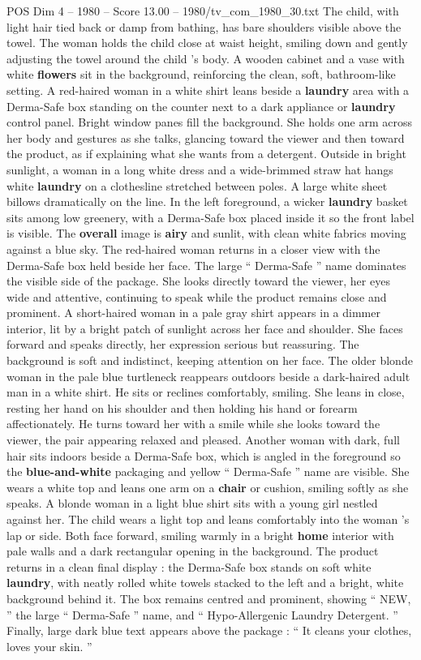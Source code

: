 \begin{textsample}{POS Dim 4 – 1980 – Score 13.00 – 1980/tv\_com\_1980\_30.txt}
The child, with light hair tied back or damp from bathing, has bare shoulders visible above the towel.
The woman holds the child close at waist height, smiling down and gently adjusting the towel around the child ’s body.
A wooden cabinet and a vase with white \textbf{flowers} sit in the background, reinforcing the clean, soft, bathroom-like setting.
A red-haired woman in a white shirt leans beside a \textbf{laundry} area with a Derma-Safe box standing on the counter next to a dark appliance or \textbf{laundry} control panel.
Bright window panes fill the background.
She holds one arm across her body and gestures as she talks, glancing toward the viewer and then toward the product, as if explaining what she wants from a detergent.
Outside in bright sunlight, a woman in a long white dress and a wide-brimmed straw hat hangs white \textbf{laundry} on a clothesline stretched between poles.
A large white sheet billows dramatically on the line.
In the left foreground, a wicker \textbf{laundry} basket sits among low greenery, with a Derma-Safe box placed inside it so the front label is visible.
The \textbf{overall} image is \textbf{airy} and sunlit, with clean white fabrics moving against a blue sky.
The red-haired woman returns in a closer view with the Derma-Safe box held beside her face.
The large “ Derma-Safe ” name dominates the visible side of the package.
She looks directly toward the viewer, her eyes wide and attentive, continuing to speak while the product remains close and prominent.
A short-haired woman in a pale gray shirt appears in a dimmer interior, lit by a bright patch of sunlight across her face and shoulder.
She faces forward and speaks directly, her expression serious but reassuring.
The background is soft and indistinct, keeping attention on her face.
The older blonde woman in the pale blue turtleneck reappears outdoors beside a dark-haired adult man in a white shirt.
He sits or reclines comfortably, smiling.
She leans in close, resting her hand on his shoulder and then holding his hand or forearm affectionately.
He turns toward her with a smile while she looks toward the viewer, the pair appearing relaxed and pleased.
Another woman with dark, full hair sits indoors beside a Derma-Safe box, which is angled in the foreground so the \textbf{blue-and-white} packaging and yellow “ Derma-Safe ” name are visible.
She wears a white top and leans one arm on a \textbf{chair} or cushion, smiling softly as she speaks.
A blonde woman in a light blue shirt sits with a young girl nestled against her.
The child wears a light top and leans comfortably into the woman ’s lap or side.
Both face forward, smiling warmly in a bright \textbf{home} interior with pale walls and a dark rectangular opening in the background.
The product returns in a clean final display : the Derma-Safe box stands on soft white \textbf{laundry}, with neatly rolled white towels stacked to the left and a bright, white background behind it.
The box remains centred and prominent, showing “ NEW, ” the large “ Derma-Safe ” name, and “ Hypo-Allergenic Laundry Detergent. ” Finally, large dark blue text appears above the package : “ It cleans your clothes, loves your skin. ”


\end{textsample}
